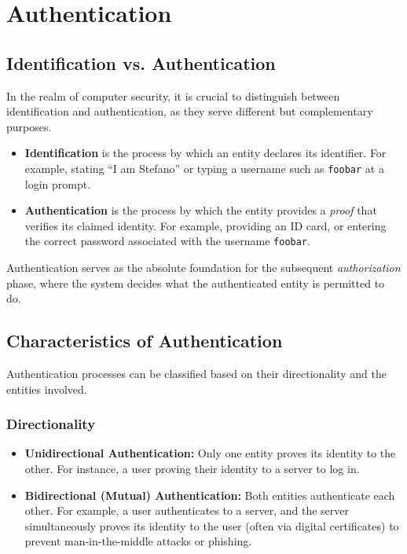\chapter{Authentication}
\label{ch:authentication}

\section{Identification vs. Authentication}
In the realm of computer security, it is crucial to distinguish between identification and authentication, as they serve different but complementary purposes.
\begin{itemize}
    \item \textbf{Identification} is the process by which an entity declares its identifier. For example, stating ``I am Stefano'' or typing a username such as \texttt{foobar} at a login prompt.
    \item \textbf{Authentication} is the process by which the entity provides a \textit{proof} that verifies its claimed identity. For example, providing an ID card, or entering the correct password associated with the username \texttt{foobar}.
\end{itemize}
Authentication serves as the absolute foundation for the subsequent \textit{authorization} phase, where the system decides what the authenticated entity is permitted to do.

\section{Characteristics of Authentication}
Authentication processes can be classified based on their directionality and the entities involved.

\subsection{Directionality}
\begin{itemize}
    \item \textbf{Unidirectional Authentication:} Only one entity proves its identity to the other. For instance, a user proving their identity to a server to log in. 
    \item \textbf{Bidirectional (Mutual) Authentication:} Both entities authenticate each other. For example, a user authenticates to a server, and the server simultaneously proves its identity to the user (often via digital certificates) to prevent man-in-the-middle attacks or phishing.
\end{itemize}

